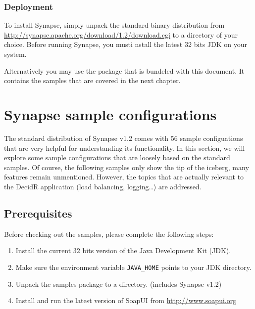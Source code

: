 \subsubsection{Deployment}
\label{subsec:deployment}

To install Synapse, simply unpack the standard binary distribution from
\url{http://synapse.apache.org/download/1.2/download.cgi} to a directory of
your choice. Before running Synapse, you musti nstall the latest 32 bits JDK on
your system.

Alternatively you may use the package that is bundeled with this document. It
contains the samples that are covered in the next chapter.

\section{Synapse sample configurations}
\label{chap:synapse-sample-configurations}
\lstset{frame=single,
	    basicstyle=\tiny,
	    numbers=left,                   
		numberstyle=\tiny, 
	    commentstyle=\textit,
	    breaklines=true}

The standard distribution of Synapse v1.2 comes with 56 sample configuations that
are very helpful for understanding its functionality. In this section, we will
explore some sample configurations that are loosely based on the standard
samples. Of course, the following samples only show the tip of the iceberg, many
features remain unmentioned. However, the topics that are actually relevant to
the DecidR application (load balancing, logging\ldots) are addressed.

\subsection{Prerequisites}
\label{sec:prerequisites}

Before checking out the samples, please complete the following steps: 

\begin{enumerate}
\item Install the current 32 bits version of the Java Development Kit (JDK).
\item Make sure the environment variable \texttt{JAVA\_HOME} points to your JDK
directory.
\item Unpack the samples package to a directory. (includes Synapse
v1.2)
\item Install and run the latest version of SoapUI from
\url{http://www.soapui.org}
\end{enumerate}

